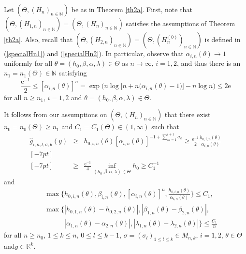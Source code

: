 \documentclass[number,citesort,seceqn,dvips]{arxbj}
\newcommand{\eqref}[1]{(\ref{#1})}
\newcommand{\RR}{\mathbb{R}}
\newcommand{\NN}{\mathbb{N}}
\begin{document}
\begin{pf}
Let $(\Theta,(H_n)_{n\in\NN})$ be as in Theorem \ref{th2a}. First, note
that $(\Theta,(H_{1,n})_{n\in\NN})=(\Theta,(H_n)_{n\in\NN})$ satisfies
the assumptions of Theorem \ref{th2a}. Also, recall that
$(\Theta,(H_{2,n})_{n\in\NN})=(\Theta,(H^{(0)}_{n})_{n\in\NN})$ is
defined in \eqref{specialHn1} and \eqref{specialHn2}. In particular,
observe that $\alpha_{i,n}(\theta)\to1$ uniformly for all
$\theta=(h_0,\beta,\alpha,\lambda)\in\Theta$ as $n\to\infty$, $i=1,2$,
and thus there is an $n_1=n_1(\Theta)\in\NN$ satisfying
%
\begin{equation}\label{deltahochn}
\frac{\mathrm{e}^{-1}}2 \le[\alpha
_{i,n}(\theta)]^n=\exp\bigl(n\log\bigl[n+n\bigl(\alpha_{i,n}(\theta) -
1\bigr)\bigr]-n\log
n\bigr) \le 2 \mathrm{e}
\end{equation}
%
for all $n\ge n_1$, $i=1,2$ and
$\theta=(h_0,\beta,\alpha,\lambda)\in\Theta$.

It follows from our assumptions on $(\Theta,(H_n)_{n\in\NN})$ that
there exist $n_0=n_0(\Theta)\ge n_1$ and $C_1=C_1(\Theta)\in
(1,\infty)$
such that\vspace*{-2pt}
%
\begin{eqnarray}\label{lowerbound}
\hat g_{i,n,l,\sigma,\theta}(y)&\ge&
h_{0,i,n}(\theta)[\alpha_{i,n}(\theta)]^{-1+\sum_{m=1}^{l+1}\sigma_k}
\ge \frac{\mathrm{e}^{-1}}
2\frac{h_{0,i,n}(\theta)}{\alpha_{i,n}(\theta)}\nonumber\\ [-7pt]\\ [-7pt]
&\ge& \frac{\mathrm{e}^{-1}}
4\inf_{(h_0,\beta,\alpha,\lambda)\in\overline\Theta}h_{0}
 \ge C_1^{-1}\nonumber
\end{eqnarray}
%
and
%
\begin{eqnarray}\label{upperbound}
&&\max \biggl\{h_{0,i,n}(\theta) , \beta_{i,n}(\theta) ,
[\alpha_{i,n}(\theta)]^n ,
\frac{h_{0,i,n}(\theta)}{\alpha_{i,n}(\theta)}  \biggr\} \le
C_1 , \nonumber\\[1pt]
&&\max \{|h_{0,1,n}(\theta) - h_{0,2,n}(\theta)| ,
|\beta_{1,n}(\theta) - \beta_{2,n}(\theta)| ,\\[1pt]
&&\phantom{\max \{}|\alpha_{1,n}(\theta) - \alpha_{2,n}(\theta)| ,
|\lambda_{1,n}(\theta) - \lambda_{2,n}(\theta)| \} \le
\frac{C_1}n\nonumber
\end{eqnarray}
%
for all $n\ge n_0$, $1 \le  k \le  n$, $0 \le  l \le  k - 1$,
$\sigma=(\sigma_l)_{1\le l\le k}\in M_{n,k}$, $i=1,2$,
$\theta\in\Theta$ and\break $y\in\RR^k$.


\end{pf}
\end{document}

